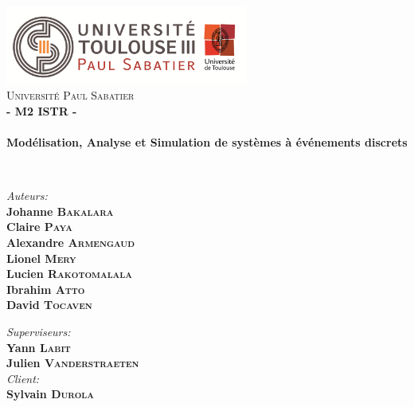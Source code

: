 



\begin{titlepage}
\begin{center}


\includegraphics[width=0.60\textwidth]{./Page_de_garde/logo_ups.png}~\\[1cm]

\textsc{\LARGE Université Paul Sabatier}\\[1.5cm]

\textsc{\Large \bf - M2 ISTR -}\\[0.5cm]

\HRule \\[0.4cm]

{\huge \bfseries  Modélisation, Analyse et Simulation de systèmes à
événements discrets}

\HRule \\[1.5cm]

\begin{minipage}{0.4\textwidth}
\begin{flushleft} \large
\emph{Auteurs:}\\
\textbf{Johanne \textsc{Bakalara}}\\
\textbf{Claire \textsc{Paya}}\\
\textbf{Alexandre \textsc{Armengaud}}\\
\textbf{Lionel \textsc{Mery}}\\
\textbf{Lucien \textsc{Rakotomalala}}\\
\textbf{Ibrahim \textsc{Atto}}\\
\textbf{David \textsc{Tocaven}}\\
\end{flushleft}
\end{minipage}
\begin{minipage}{0.4\textwidth}
\begin{flushright} \large
\emph{Superviseurs:} \\
\textbf{ Yann \textsc{Labit}}\\
\textbf{Julien \textsc{Vanderstraeten}}\\
 \vspace{1cm}
\emph{Client:} \\
\textbf{Sylvain \textsc{Durola}}
\end{flushright}
\end{minipage}
\newline
\newline


\end{center}
\end{titlepage}

